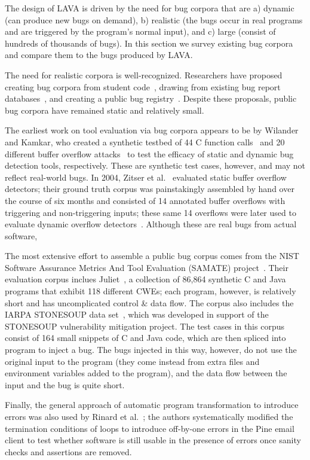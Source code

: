 The design of LAVA is driven by the need for bug corpora that are a)
dynamic (can produce new bugs on demand), b) realistic (the bugs occur
in real programs and are triggered by the program's normal input), and
c) large (consist of hundreds of thousands of bugs). In this section we
survey existing bug corpora and compare them to the bugs produced by
LAVA.

The need for realistic corpora is well-recognized. Researchers have
proposed creating bug corpora from student code~\cite{Spacco:2005},
drawing from existing bug report databases~\cite{Lu:2005,Meftah:2005},
and creating a public bug registry~\cite{Foster:2005}. Despite these
proposals, public bug corpora have remained static and relatively small.

The earliest work on tool evaluation via bug corpora appears to be by
Wilander and Kamkar, who created a synthetic testbed of 44 C function
calls~\cite{Wilander:2002} and 20 different buffer overflow
attacks~\cite{Wilander:2003} to test the efficacy of static and dynamic
bug detection tools, respectively. These are synthetic test cases,
however, and may not reflect real-world bugs. In 2004, Zitser et
al.~\cite{Zitser:2004} evaluated static buffer overflow detectors; their
ground truth corpus was painstakingly assembled by hand over the course
of six months and consisted of 14 annotated buffer overflows with
triggering and non-triggering inputs; these same 14 overflows were later
used to evaluate dynamic overflow detectors~\cite{Zhivich:2005}.
Although these are real bugs from actual software, 

The most extensive effort to assemble a public bug corpus comes from the
NIST Software Assurance Metrics And Tool Evaluation (SAMATE)
project~\cite{Kass:2005}. Their evaluation corpus inclues
Juliet~\cite{Juliet:2012}, a collection of 86,864 synthetic C and Java
programs that exhibit 118 different CWEs; each program, however, is
relatively short and has uncomplicated control \& data flow. The corpus
also includes the IARPA STONESOUP data set~\cite{SAMATE:2014}, which was
developed in support of the STONESOUP vulnerability mitigation project.
The test cases in this corpus consist of 164 small snippets of C and
Java code, which are then spliced into program to inject a bug. The bugs
injected in this way, however, do not use the original input to the
program (they come instead from extra files and environment variables
added to the program), and the data flow between the input and the bug
is quite short.

Finally, the general approach of automatic program transformation to
introduce errors was also used by Rinard et al.~\cite{Rinard:2005}; the
authors systematically modified the termination conditions of loops to
introduce off-by-one errors in the Pine email client to test whether
software is still usable in the presence of errors once sanity checks
and assertions are removed.
